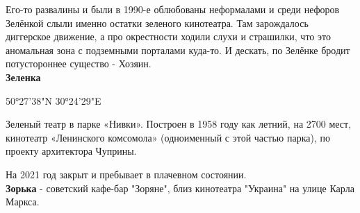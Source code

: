 Его-то развалины и были в 1990-е облюбованы неформалами и среди нефоров Зелёнкой слыли именно остатки зеленого кинотеатра. Там зарождалось диггерское движение, а про окрестности ходили слухи и страшилки, что это аномальная зона с подземными порталами куда-то. И дескать, по Зелёнке бродит потустороннее существо - Хозяин.\\


\textbf{Зеленка}

50°27'38"N 30°24'29"E

Зеленый театр в парке «Нивки». Построен в 1958 году как летний, на 2700 мест, кинотеатр «Ленинского комсомола» (одноименный с этой частью парка), по проекту архитектора Чуприны.

На 2021 год закрыт и пребывает в плачевном состоянии.\\

\textbf{Зорька} - советский кафе-бар "Зоряне", близ кинотеатра "Украина" на улице Карла Маркса.\\
